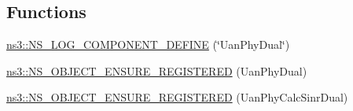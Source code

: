 \subsection*{Functions}
\begin{DoxyCompactItemize}
\item 
\hyperlink{namespacens3_a7af7f0526abc8fa2bbef47330cbf8e05}{ns3\+::\+N\+S\+\_\+\+L\+O\+G\+\_\+\+C\+O\+M\+P\+O\+N\+E\+N\+T\+\_\+\+D\+E\+F\+I\+NE} (\char`\"{}Uan\+Phy\+Dual\char`\"{})
\item 
\hyperlink{namespacens3_a456ff1af60635fcb7516b34f0ce7b46c}{ns3\+::\+N\+S\+\_\+\+O\+B\+J\+E\+C\+T\+\_\+\+E\+N\+S\+U\+R\+E\+\_\+\+R\+E\+G\+I\+S\+T\+E\+R\+ED} (Uan\+Phy\+Dual)
\item 
\hyperlink{namespacens3_a881270064b426a1f40be8a0191c28d19}{ns3\+::\+N\+S\+\_\+\+O\+B\+J\+E\+C\+T\+\_\+\+E\+N\+S\+U\+R\+E\+\_\+\+R\+E\+G\+I\+S\+T\+E\+R\+ED} (Uan\+Phy\+Calc\+Sinr\+Dual)
\end{DoxyCompactItemize}

